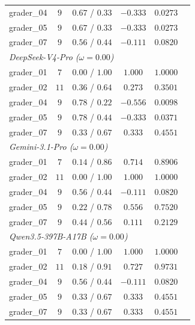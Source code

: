 \begin{table}[p]
\begin{tabular*}{\textwidth}{@{\extracolsep{\fill}}lccccc@{}}
\quad grader\_04 & $9$ & $0.67$ / $0.33$ & $-0.333$ & $0.0273$ &  \\
\quad grader\_05 & $9$ & $0.67$ / $0.33$ & $-0.333$ & $0.0273$ &  \\
\quad grader\_07 & $9$ & $0.56$ / $0.44$ & $-0.111$ & $0.0820$ &  \\
\multicolumn{6}{l}{\textit{DeepSeek-V4-Pro ($\omega=0.00$)}} \\
\quad grader\_01 & $7$ & $0.00$ / $1.00$ & $1.000$ & $1.0000$ &  \\
\quad grader\_02 & $11$ & $0.36$ / $0.64$ & $0.273$ & $0.3501$ &  \\
\quad grader\_04 & $9$ & $0.78$ / $0.22$ & $-0.556$ & $0.0098$ &  \\
\quad grader\_05 & $9$ & $0.78$ / $0.44$ & $-0.333$ & $0.0371$ &  \\
\quad grader\_07 & $9$ & $0.33$ / $0.67$ & $0.333$ & $0.4551$ &  \\
\multicolumn{6}{l}{\textit{Gemini-3.1-Pro ($\omega=0.00$)}} \\
\quad grader\_01 & $7$ & $0.14$ / $0.86$ & $0.714$ & $0.8906$ &  \\
\quad grader\_02 & $11$ & $0.00$ / $1.00$ & $1.000$ & $1.0000$ &  \\
\quad grader\_04 & $9$ & $0.56$ / $0.44$ & $-0.111$ & $0.0820$ &  \\
\quad grader\_05 & $9$ & $0.22$ / $0.78$ & $0.556$ & $0.7520$ &  \\
\quad grader\_07 & $9$ & $0.44$ / $0.56$ & $0.111$ & $0.2129$ &  \\
\multicolumn{6}{l}{\textit{Qwen3.5-397B-A17B ($\omega=0.00$)}} \\
\quad grader\_01 & $7$ & $0.00$ / $1.00$ & $1.000$ & $1.0000$ &  \\
\quad grader\_02 & $11$ & $0.18$ / $0.91$ & $0.727$ & $0.9731$ &  \\
\quad grader\_04 & $9$ & $0.56$ / $0.44$ & $-0.111$ & $0.0820$ &  \\
\quad grader\_05 & $9$ & $0.33$ / $0.67$ & $0.333$ & $0.4551$ &  \\
\quad grader\_07 & $9$ & $0.33$ / $0.67$ & $0.333$ & $0.4551$ &  \\
\bottomrule
\end{tabular*}
\end{table}
